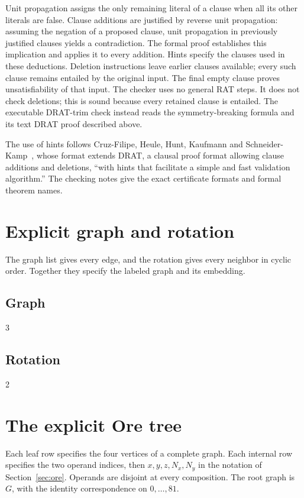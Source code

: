 \documentclass[11pt]{article}
\begin{document}
\begin{appendices}
Unit propagation assigns the only remaining literal of a clause when
all its other literals are false. Clause additions are justified by
reverse unit propagation: assuming
the negation of a proposed clause, unit propagation in previously justified
clauses yields a contradiction. The formal proof establishes this
implication and applies it to every addition. Hints specify the clauses
used in these deductions. Deletion instructions leave earlier clauses
available; every such clause remains entailed by the original input.
The final empty clause proves unsatisfiability of that input.
The checker uses no general RAT steps. It does not check deletions; this
is sound because every retained clause is entailed.
The executable DRAT-trim check instead reads the symmetry-breaking
formula and its text DRAT proof described above.

The use of hints follows Cruz-Filipe, Heule, Hunt, Kaufmann and
Schneider-Kamp~\cite[abstract]{lrat}, whose format extends DRAT, a
clausal proof format allowing clause additions and deletions,
``with hints that facilitate a simple and fast validation algorithm.''
The checking notes give the exact certificate formats and formal theorem
names.

\clearpage
\section{Explicit graph and rotation}\label{app:graph}
The graph list gives every edge, and the rotation gives every neighbor
in cyclic order. Together they specify the labeled graph and its embedding.
\subsection*{Graph}
\begin{multicols}{3}\footnotesize
{}
\end{multicols}
\clearpage
\subsection*{Rotation}
\begin{multicols}{2}\footnotesize
{}
\end{multicols}
\clearpage
\section{The explicit Ore tree}\label{app:ore}
Each leaf row specifies the four vertices of a complete graph. Each
internal row specifies the two operand indices, then $x,y,z,N_x,N_y$
in the notation of Section~\ref{sec:ore}. Operands are disjoint at every
composition. The root graph is $G$, with the identity correspondence on
$0,\ldots,81$.



\end{appendices}
\end{document}
